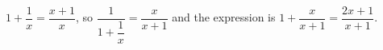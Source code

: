 $1+\dfrac{1}{x}=\dfrac{x+1}{x}$, so $\dfrac{1}{1+\dfrac{1}{x}}=\dfrac{x}{x+1}$ and the expression is $1+\dfrac{x}{x+1}=\boxed{\dfrac{2x+1}{x+1}}$.
